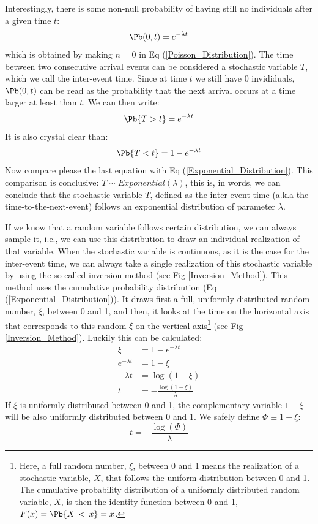 Interestingly, there is some non-null probability of having still no individuals after a given time $t$:
\begin{equation}
\Pb(0, t) =  e^{-\lambda t}
\label{Eq_Exp_1}
\end{equation}
which is obtained by making $n=0$ in Eq (\ref{Poisson_Distribution}). The time between two consecutive arrival events can be considered a stochastic variable $T$, which we call the inter-event time.  Since at time $t$ we still have 0 invididuals, $\Pb(0, t)$ can be read as the probability that the next arrival occurs at a time larger at least than $t$. We can then write:
\begin{equation}
\Pb\{T>t\} =  e^{-\lambda t}
\end{equation}
It is also crystal clear than:
\begin{equation}
\Pb\{T<t\} =  1 - e^{-\lambda t}
\end{equation}
Now compare please the last equation with Eq (\ref{Exponential_Distribution}). This comparison is conclusive: $T \sim Exponential(\lambda)$, this is, in words, we can conclude that the stochastic variable $T$, defined as the inter-event time (a.k.a the time-to-the-next-event) follows an exponential distribution of parameter $\lambda$. 
\smallskip

If we know that a random variable follows certain distribution, we can always sample it, i.e., we can use this distribution to draw an individual realization of that variable. When the stochastic variable is continuous, as it is the case for the inter-event time, we can always take a single realization of this stochastic variable by using the so-called inversion method (see Fig \ref{Inversion_Method}). This method uses the cumulative probability distribution (Eq (\ref{Exponential_Distribution})). It draws first a full, uniformly-distributed random number, $\xi$, between 0 and 1, and then, it looks at the time on the horizontal axis that corresponds to this random $\xi$ on the vertical axis\footnote{Here, a full random number, $\xi$, between 0 and 1 means the realization of a stochastic variable, $X$, that follows the uniform distribution between 0 and 1. The cumulative probability distribution of a uniformly distributed random variable, $X$, is then the identity function between 0 and 1, $F(x) = \Pb\{X\,<\,x\}= x$.}  (see Fig \ref{Inversion_Method}). Luckily this can be calculated:
\begin{align*}
 \xi            &= 1 - e^{-\lambda t}            \\
 e^{-\lambda t} &= 1 - \xi                       \\
 -\lambda t     &= \log(1 - \xi)                 \\
          t     &= -\frac{\log(1 - \xi)}{\lambda}
\end{align*}
If $\xi$ is uniformly distributed between 0 and 1, the complementary variable $1-\xi$ will be also uniformly distributed between 0 and 1. We safely define $\Phi \equiv 1-\xi$:
\begin{equation}
 t     = -\frac{\log(\Phi)}{\lambda}
 \label{Random_Time}
\end{equation}

